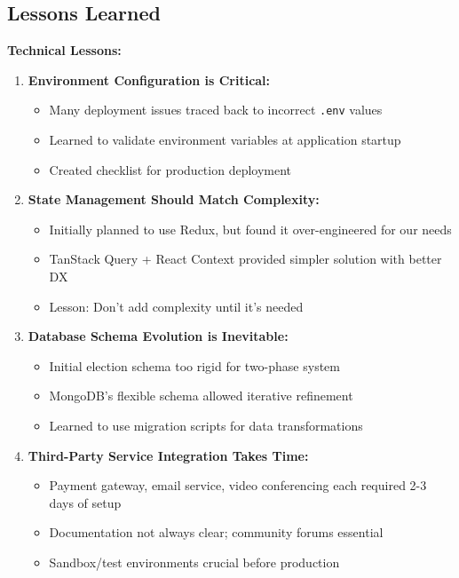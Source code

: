 \documentclass[12pt,a4paper]{article}
\begin{document}
\subsection{Lessons Learned}

\textbf{Technical Lessons:}

\begin{enumerate}[noitemsep]
  \item \textbf{Environment Configuration is Critical:}
  \begin{itemize}[noitemsep]
    \item Many deployment issues traced back to incorrect \texttt{.env} values
    \item Learned to validate environment variables at application startup
    \item Created checklist for production deployment
  \end{itemize}
  
  \item \textbf{State Management Should Match Complexity:}
  \begin{itemize}[noitemsep]
    \item Initially planned to use Redux, but found it over-engineered for our needs
    \item TanStack Query + React Context provided simpler solution with better DX
    \item Lesson: Don't add complexity until it's needed
  \end{itemize}
  
  \item \textbf{Database Schema Evolution is Inevitable:}
  \begin{itemize}[noitemsep]
    \item Initial election schema too rigid for two-phase system
    \item MongoDB's flexible schema allowed iterative refinement
    \item Learned to use migration scripts for data transformations
  \end{itemize}
  
  \item \textbf{Third-Party Service Integration Takes Time:}
  \begin{itemize}[noitemsep]
    \item Payment gateway, email service, video conferencing each required 2-3 days of setup
    \item Documentation not always clear; community forums essential
    \item Sandbox/test environments crucial before production
  \end{itemize}
  

\end{enumerate}
\end{document}
